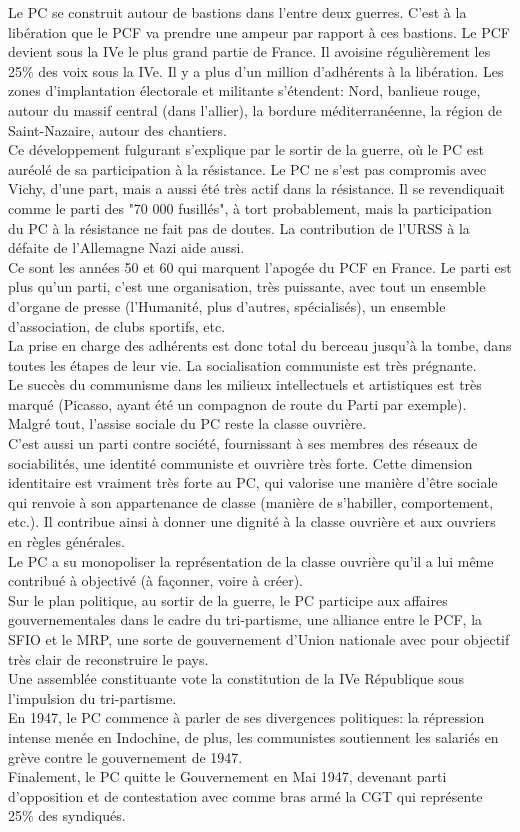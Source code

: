 \documentclass[10pt, a4paper, openany]{book}
\begin{document}
Le PC se construit autour de bastions dans l'entre deux guerres. C'est à la libération que le PCF va prendre une ampeur par rapport à ces bastions. Le PCF devient sous la IVe le plus grand partie de France. Il avoisine régulièrement les 25\% des voix sous la IVe. Il y a plus d'un million d'adhérents à la libération. Les zones d'implantation électorale et militante s'étendent: Nord, banlieue rouge, autour du massif central (dans l'allier), la bordure méditerranéenne, la région de Saint-Nazaire, autour des chantiers. \\
Ce développement fulgurant s'explique par le sortir de la guerre, où le PC est auréolé de sa participation à la résistance. Le PC ne s'est pas compromis avec Vichy, d'une part, mais a aussi été très actif dans la résistance. Il se revendiquait comme le parti des "70 000 fusillés", à tort probablement, mais la participation du PC à la résistance ne fait pas de doutes. La contribution de l'URSS à la défaite de l'Allemagne Nazi aide aussi. \\
Ce sont les années 50 et 60 qui marquent l'apogée du PCF en France. Le parti est plus qu'un parti, c'est une organisation, très puissante, avec tout un ensemble d'organe de presse (l'Humanité, plus d'autres, spécialisés), un ensemble d'association, de clubs sportifs, etc. \\
La prise en charge des adhérents est donc total du berceau jusqu'à la tombe, dans toutes les étapes de leur vie. La socialisation communiste est très prégnante. \\
Le succès du communisme dans les milieux intellectuels et artistiques est très marqué (Picasso, ayant été un compagnon de route du Parti par exemple). Malgré tout, l'assise sociale du PC reste la classe ouvrière. \\
C'est aussi un parti contre société, fournissant à ses membres des réseaux de sociabilités, une identité communiste et ouvrière très forte. Cette dimension identitaire est vraiment très forte au PC, qui valorise une manière d'être sociale qui renvoie à son appartenance de classe (manière de s'habiller, comportement, etc.). Il contribue ainsi à donner une dignité à la classe ouvrière et aux ouvriers en règles générales. \\
Le PC a su monopoliser la représentation de la classe ouvrière qu'il a lui même contribué à objectivé (à façonner, voire à créer). \\
Sur le plan politique, au sortir de la guerre, le PC participe aux affaires gouvernementales dans le cadre du tri-partisme, une alliance entre le PCF, la SFIO et le MRP, une sorte de gouvernement d'Union nationale avec pour objectif très clair de reconstruire le pays. \\
Une assemblée constituante vote la constitution de la IVe République sous l'impulsion du tri-partisme. \\
En 1947, le PC commence à parler de ses divergences politiques: la répression intense menée en Indochine, de plus, les communistes soutiennent les salariés en grève contre le gouvernement de 1947. \\
Finalement, le PC quitte le Gouvernement en Mai 1947, devenant parti d'opposition et de contestation avec comme bras armé la CGT qui représente 25\% des syndiqués. 
\end{document}
